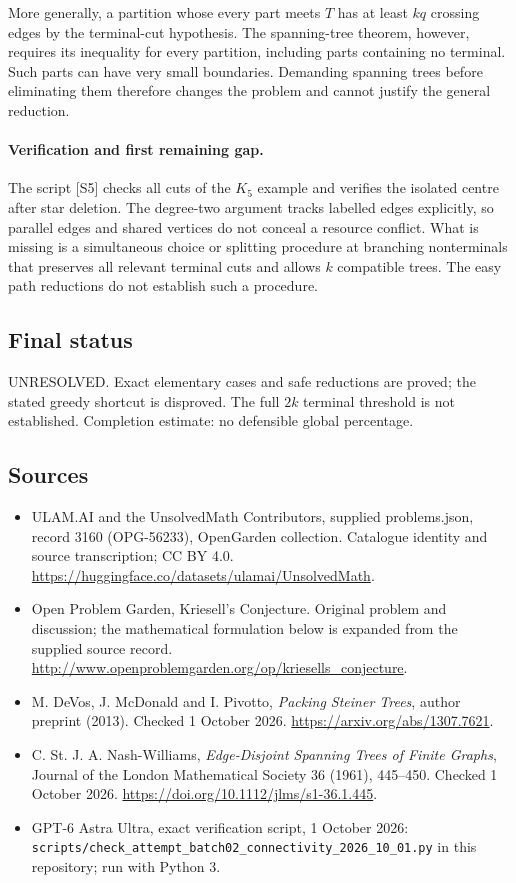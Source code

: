\documentclass[11pt,a4paper]{article}
\begin{document}
More generally, a partition whose every part meets $T$ has at least
$kq$ crossing edges by the terminal-cut hypothesis. The spanning-tree
theorem, however, requires its inequality for every partition,
including parts containing no terminal. Such parts can have very small
boundaries. Demanding spanning trees before eliminating them therefore
changes the problem and cannot justify the general reduction.

\paragraph{Verification and first remaining gap.}
The script [S5] checks all cuts of the $K_5$ example and verifies the
isolated centre after star deletion. The degree-two argument tracks
labelled edges explicitly, so parallel edges and shared vertices do
not conceal a resource conflict. What is missing is a simultaneous
choice or splitting procedure at branching nonterminals that preserves
all relevant terminal cuts and allows $k$ compatible trees. The easy
path reductions do not establish such a procedure.

\subsection{Final status}
UNRESOLVED. Exact elementary cases and safe reductions are proved;
the stated greedy shortcut is disproved. The full $2k$ terminal
threshold is not established. Completion estimate: no defensible global
percentage.

\subsection{Sources}
\begin{itemize}
\item[S1] ULAM.AI and the UnsolvedMath Contributors, supplied problems.json, record 3160 (OPG-56233), OpenGarden collection. Catalogue identity and source transcription; CC BY 4.0.
\url{https://huggingface.co/datasets/ulamai/UnsolvedMath}.
\item[S2] Open Problem Garden, Kriesell's Conjecture. Original problem and discussion; the mathematical formulation below is expanded from the supplied source record.
\url{http://www.openproblemgarden.org/op/kriesells_conjecture}.
\item[S3] M. DeVos, J. McDonald and I. Pivotto, \emph{Packing Steiner Trees}, author preprint (2013). Checked 1 October 2026.
\url{https://arxiv.org/abs/1307.7621}.
\item[S4] C. St. J. A. Nash-Williams, \emph{Edge-Disjoint Spanning Trees of Finite Graphs}, Journal of the London Mathematical Society 36 (1961), 445--450. Checked 1 October 2026.
\url{https://doi.org/10.1112/jlms/s1-36.1.445}.
\item[S5] GPT-6 Astra Ultra, exact verification script, 1 October 2026: \texttt{scripts/check\_attempt\_batch02\_connectivity\_2026\_10\_01.py} in this repository; run with Python 3.
\end{itemize}
\end{document}
